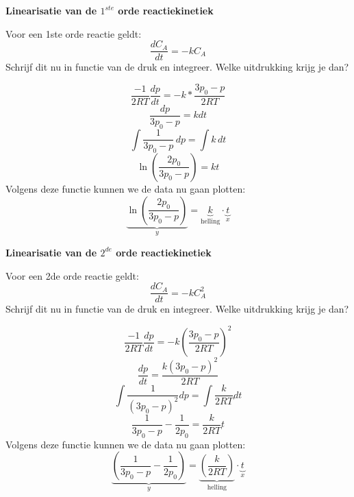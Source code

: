 \documentclass{ximera}
\begin{document}
\begin{question} \textbf{Linearisatie van de $1^{ste}$ orde reactiekinetiek}
    
    Voor een 1ste orde reactie geldt: 
    \[
    \frac{dC_A}{dt} = - k C_A
    \]
    Schrijf dit nu in functie van de druk en integreer.
    Welke uitdrukking krijg je dan?
    
    \begin{multipleChoice}
    \end{multipleChoice}
    
    \begin{feedback}
        \[
        \frac{-1}{2RT}\frac{dp}{dt} = -k*\frac{3p_0-p}{2RT}
        \]
        \[
        \frac{dp}{3p_0-p} =  k dt
        \]
        \[
        \int \frac{1}{3p_0-p}\,dp = \int k\,dt
        \]
        \[
        \ln\left(\frac{2p_0}{3p_0-p}\right)=  k t
        \]
        Volgens deze functie kunnen we de data nu gaan plotten:
        \[
        \underbrace{\ln\left(\frac{2p_0}{3p_0-p}\right)}_{y}
        =
        \underbrace{k}_{\text{helling}}
        \cdot
        \underbrace{t}_{x}
        \]
    \end{feedback}
\end{question}

\begin{question} \textbf{Linearisatie van de $2^{de}$ orde reactiekinetiek}

    Voor een 2de orde reactie geldt: 
    \[
    \frac{dC_A}{dt} = - k C_A^2
    \]
    Schrijf dit nu in functie van de druk en integreer.
    Welke uitdrukking krijg je dan?
    
    \begin{multipleChoice}
    \end{multipleChoice}
    
    \begin{feedback}
        \[
        \frac{-1}{2RT}\frac{dp}{dt} = -k (\frac{3p_0-p}{2RT})^2
        \]
        \[
        \frac{dp}{dt} = \frac{k(3p_0-p)^2}{2RT} 
        \]
        \[
        \int \frac{1}{(3p_0-p)^2} dp = \int\frac{k}{2RT}dt
        \]
        \[
        \frac{1}{3p_0-p} - \frac{1}{2p_0}= \frac{k}{2RT}  t
        \]
        Volgens deze functie kunnen we de data nu gaan plotten:
        \[
        \underbrace{\left(\frac{1}{3p_0-p} - \frac{1}{2p_0}\right)}_{y}
        =
        \underbrace{\left(\frac{k}{2RT} \right)}_{\text{helling}}
        \cdot
        \underbrace{t}_{x}
        \]
    \end{feedback}
\end{question}
\end{document}
